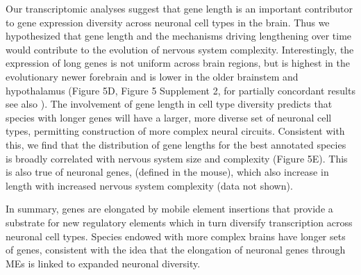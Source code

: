Our transcriptomic analyses suggest that gene length is an important contributor to gene expression diversity across neuronal cell types in the brain. 
Thus we hypothesized that gene length and the mechanisms driving lengthening over time would contribute to the evolution of nervous system complexity. Interestingly, the expression of long genes is not uniform across brain regions, but is highest in the evolutionary newer forebrain and is lower in the older brainstem and hypothalamus (Figure 5D, Figure 5 Supplement 2, for partially concordant results see also \cite{Zylka_2015}). 
The involvement of gene length in cell type diversity predicts that species with longer genes will have a larger, more diverse set of neuronal cell types, permitting construction of more complex neural circuits. Consistent with this, we find that the distribution of gene lengths for the best annotated species is broadly correlated with nervous system size and complexity (Figure 5E). This is also true of neuronal genes, (defined in the mouse), which also increase in length with increased nervous system complexity (data not shown). 

In summary, genes are elongated by mobile element insertions that provide a substrate for new 
regulatory elements which in turn diversify transcription across neuronal cell types. Species endowed with more complex brains have longer sets of genes, consistent with the idea that the elongation of neuronal genes through MEs is linked to expanded neuronal diversity.




